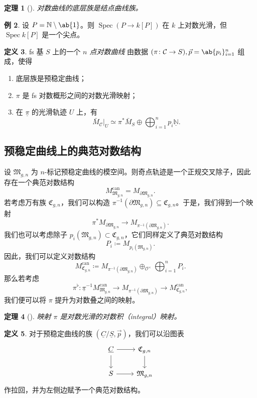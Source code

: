 \documentclass{amsart}
\newtheorem{thm}{定理}[section]
\theoremstyle{definition}
\newtheorem{defn}[thm]{定义}
\newtheorem{exm}[thm]{例}
\theoremstyle{remark}
\theoremstyle{plain}
\theoremstyle{definition}
\theoremstyle{remark}
\newcommand{\N}{\mathbb{N}}
\newcommand{\mc}[1]{\mathcal{#1}}
\newcommand{\mf}[1]{\mathfrak{#1}}
\newcommand{\on}[1]{\operatorname{#1}}
\newcommand{\ul}[1]{\underline{#1}}
\newcommand{\1}{\mathbf{1}}
\newcommand{\2}{\mathbf{2}}
\newcommand{\3}{\mathbf{3}}
\DeclareMathOperator{\Spec}{Spec}
\begin{document}
\begin{thm}[{\cite{FKato2000}}]
    对数曲线的底层族是结点曲线族。
\end{thm}

\begin{exm}
    设 \(P = \N \setminus \ab\{1\}\)。则 \(\Spec (P \to k[P])\) 在 \(k\) 上对数光滑，但 \(\Spec k[P]\) 是一个尖点。
\end{exm}

\begin{defn}
    fs 基 \(S\) 上的一个 \textit{\(n\) 点对数曲线} 由数据 \((\pi \colon \mc{C} \to S), \vec{p} = \ab\{p_i\}_{i=1}^n\) 组成，使得
    \begin{enumerate}
        \item 底层族是预稳定曲线；
        \item \(\pi\) 是 fs 对数概形之间的对数光滑映射；
        \item 在 \(\ul{\pi}\) 的光滑轨迹 \(U\) 上，有
            \[ \bar{M}_{\mc{C}}|_U \simeq \pi^* \bar{M}_S \oplus \bigoplus_{i=1}^n p_i \ul{\N}. \]
    \end{enumerate}
\end{defn}
\subsection{预稳定曲线上的典范对数结构}%
\label{sub:Canonical log structures on prestable curves}

设 \(\mf{M}_{g,n}\) 为 \(n\)-标记预稳定曲线的模空间。则奇点轨迹是一个正规交叉除子，因此存在一个典范对数结构
\[ M_{\mf{M}_{g,n}}^{\on{can}} = M_{\partial \mf{M}_{g,n}}. \]
若考虑万有族 \(\mf{C}_{g,n}\)，我们可以构造 \(\pi^{-1}(\partial \mf{M}_{g,n}) \subseteq \mf{C}_{g,n}\)。于是，我们得到一个映射
\[ \pi^* M_{\partial \mf{M}_{g,n}} \to M_{\pi^{-1}(\partial \mf{M}_{g,n})}. \]
我们也可以考虑除子 \(p_i(\mf{M}_{g,n}) \subset \mf{C}_{g,n}\)，它们同样定义了典范对数结构
\[ P_i \coloneqq M_{p_i(\mf{M}_{g,n})}. \]
因此，我们可以定义对数结构
\[ M_{\mf{C}_{g,n}}^{\on{can}} \coloneqq M_{\pi^{-1}(\partial\mf{M}_{g,n})} \oplus_{\mc{O}^{\times}} \bigoplus_{i=1}^n P_i. \]
那么若考虑
\[ \pi^{\flat} \colon \ul{\pi}^{-1} M_{\mf{M}_{g,n}}^{\on{can}} \to M_{\pi^{-1}(\partial \mf{M}_{g,n})} \to M_{\mf{C}_{g,n}}^{\on{can}}, \]
我们便可以将 \(\pi\) 提升为对数叠之间的映射。

\begin{thm}[{\cite{FKato2000}}]
    映射 \(\pi\) 是对数光滑的对数积（integral）映射。
\end{thm}

\begin{defn}
    对于预稳定曲线的族 \((\ul{C}/\ul{S}, \vec{p})\)，我们可以沿图表
    \begin{equation*}
    \begin{tikzcd}
        \ul{C} \ar{r} \ar{d} & \mf{C}_{g,n} \ar{d} \\
        S \ar{r} & \mf{M}_{g,n}
    \end{tikzcd}
    \end{equation*}
    作拉回，并为左侧边赋予一个典范对数结构。
\end{defn}
\end{document}
